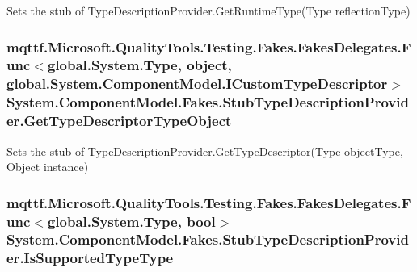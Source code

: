 Sets the stub of Type\-Description\-Provider.\-Get\-Runtime\-Type(\-Type reflection\-Type)

\hypertarget{class_system_1_1_component_model_1_1_fakes_1_1_stub_type_description_provider_a616d8f736476a94e9cfe13bbf5fc1d43}{
\subsubsection[{Get\-Type\-Descriptor\-Type\-Object}]{\setlength{\rightskip}{0pt plus 5cm}mqttf.\-Microsoft.\-Quality\-Tools.\-Testing.\-Fakes.\-Fakes\-Delegates.\-Func$<$global.\-System.\-Type, object, global.\-System.\-Component\-Model.\-I\-Custom\-Type\-Descriptor$>$ System.\-Component\-Model.\-Fakes.\-Stub\-Type\-Description\-Provider.\-Get\-Type\-Descriptor\-Type\-Object}}\label{class_system_1_1_component_model_1_1_fakes_1_1_stub_type_description_provider_a616d8f736476a94e9cfe13bbf5fc1d43}


Sets the stub of Type\-Description\-Provider.\-Get\-Type\-Descriptor(\-Type object\-Type, Object instance)

\hypertarget{class_system_1_1_component_model_1_1_fakes_1_1_stub_type_description_provider_af5ce25303ef455353bbb732e4a56b77c}{
\subsubsection[{Is\-Supported\-Type\-Type}]{\setlength{\rightskip}{0pt plus 5cm}mqttf.\-Microsoft.\-Quality\-Tools.\-Testing.\-Fakes.\-Fakes\-Delegates.\-Func$<$global.\-System.\-Type, bool$>$ System.\-Component\-Model.\-Fakes.\-Stub\-Type\-Description\-Provider.\-Is\-Supported\-Type\-Type}}\label{class_system_1_1_component_model_1_1_fakes_1_1_stub_type_description_provider_af5ce25303ef455353bbb732e4a56b77c}


